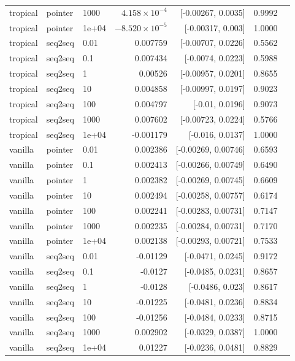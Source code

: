 \documentclass[10pt]{article}
\begin{document}
{\begin{longtable}{lllrrrl}
tropical & pointer & 1000 & $4.158\times10^{-4}$ & [-0.00267, 0.0035] & 0.9992 & \\
tropical & pointer & 1e+04 & $-8.520\times10^{-5}$ & [-0.00317, 0.003] & 1.0000 & \\
tropical & seq2seq & 0.01 & 0.007759 & [-0.00707, 0.0226] & 0.5562 & \\
tropical & seq2seq & 0.1 & 0.007434 & [-0.0074, 0.0223] & 0.5988 & \\
tropical & seq2seq & 1 & 0.00526 & [-0.00957, 0.0201] & 0.8655 & \\
tropical & seq2seq & 10 & 0.004858 & [-0.00997, 0.0197] & 0.9023 & \\
tropical & seq2seq & 100 & 0.004797 & [-0.01, 0.0196] & 0.9073 & \\
tropical & seq2seq & 1000 & 0.007602 & [-0.00723, 0.0224] & 0.5766 & \\
tropical & seq2seq & 1e+04 & -0.001179 & [-0.016, 0.0137] & 1.0000 & \\
vanilla & pointer & 0.01 & 0.002386 & [-0.00269, 0.00746] & 0.6593 & \\
vanilla & pointer & 0.1 & 0.002413 & [-0.00266, 0.00749] & 0.6490 & \\
vanilla & pointer & 1 & 0.002382 & [-0.00269, 0.00745] & 0.6609 & \\
vanilla & pointer & 10 & 0.002494 & [-0.00258, 0.00757] & 0.6174 & \\
vanilla & pointer & 100 & 0.002241 & [-0.00283, 0.00731] & 0.7147 & \\
vanilla & pointer & 1000 & 0.002235 & [-0.00284, 0.00731] & 0.7170 & \\
vanilla & pointer & 1e+04 & 0.002138 & [-0.00293, 0.00721] & 0.7533 & \\
vanilla & seq2seq & 0.01 & -0.01129 & [-0.0471, 0.0245] & 0.9172 & \\
vanilla & seq2seq & 0.1 & -0.0127 & [-0.0485, 0.0231] & 0.8657 & \\
vanilla & seq2seq & 1 & -0.0128 & [-0.0486, 0.023] & 0.8617 & \\
vanilla & seq2seq & 10 & -0.01225 & [-0.0481, 0.0236] & 0.8834 & \\
vanilla & seq2seq & 100 & -0.01256 & [-0.0484, 0.0233] & 0.8715 & \\
vanilla & seq2seq & 1000 & 0.002902 & [-0.0329, 0.0387] & 1.0000 & \\
vanilla & seq2seq & 1e+04 & 0.01227 & [-0.0236, 0.0481] & 0.8829 & \\
\bottomrule
\end{longtable}
}
\end{document}
